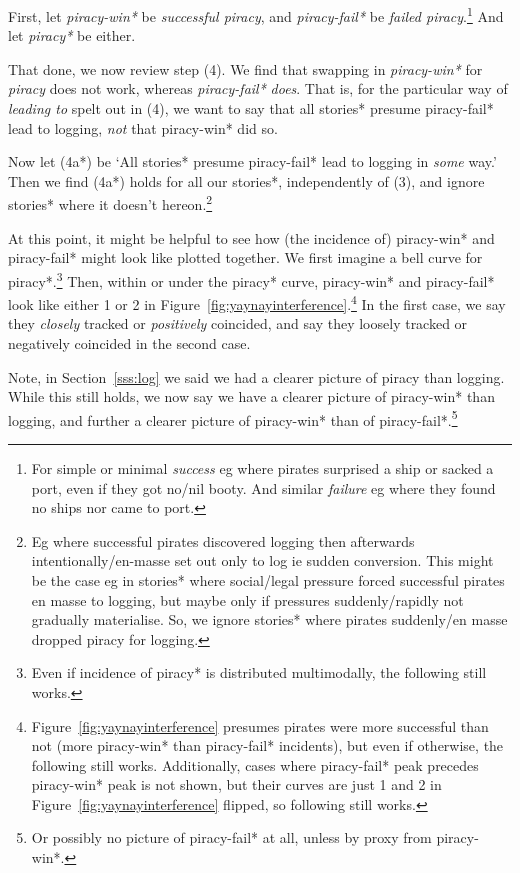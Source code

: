 \documentclass{amsart}
\newcommand{\mention}[1]{\textit{#1}} %
\theoremstyle{definition}
\theoremstyle{remark}
\begin{document}
		First, let \mention{piracy-win*} be \mention{successful piracy}, and \mention{piracy-fail*} be \mention{failed piracy}.\footnote{For simple or minimal \mention{success} eg where pirates surprised a ship or sacked a port, even if they got no/nil booty. And similar \mention{failure} eg where they found no ships nor came to port.} And let \mention{piracy*} be either.
		
		That done, we now review step (4). We find that swapping in \mention{piracy-win*} for \mention{piracy} does not work, whereas \mention{piracy-fail*} \emph{does}. That is, for the particular way of \mention{leading to} spelt out in (4), we want to say that all stories* presume piracy-fail* lead to logging, \emph{not} that piracy-win* did so.
		
		Now let (4a*) be `All stories* presume piracy-fail* lead to logging in \emph{some} way.' Then we find (4a*) holds for all our stories*, independently of (3), and ignore stories* where it doesn't hereon.\footnote{Eg where successful pirates discovered logging then afterwards intentionally/en-masse set out only to log ie sudden conversion. This might be the case eg in stories* where social/legal pressure forced successful pirates en masse to logging, but maybe only if pressures suddenly/rapidly not gradually materialise. So, we ignore stories* where pirates suddenly/en masse dropped piracy for logging.}
		
		At this point, it might be helpful to see how (the incidence of) piracy-win* and piracy-fail* might look like plotted together. We first imagine a bell curve for piracy*.\footnote{Even if incidence of piracy* is distributed multimodally, the following still works.} Then, within or under the piracy* curve, piracy-win* and piracy-fail* look like either 1 or 2 in Figure~\ref{fig:yaynayinterference}.\footnote{Figure~\ref{fig:yaynayinterference} presumes pirates were more successful than not (more piracy-win* than piracy-fail* incidents), but even if otherwise, the following still works. Additionally, cases where piracy-fail* peak precedes piracy-win* peak is not shown, but their curves are just 1 and 2 in Figure~\ref{fig:yaynayinterference} flipped, so following still works.} In the first case, we say they \emph{closely} tracked or \emph{positively} coincided, and say they loosely tracked or negatively coincided in the second case.
		
		Note, in Section~\ref{sss:log} we said we had a clearer picture of piracy than logging. While this still holds, we now say we have a clearer picture of piracy-win* than logging, and further a clearer picture of piracy-win* than of piracy-fail*.\footnote{Or possibly no picture of piracy-fail* at all, unless by proxy from piracy-win*.}
		
\end{document}
